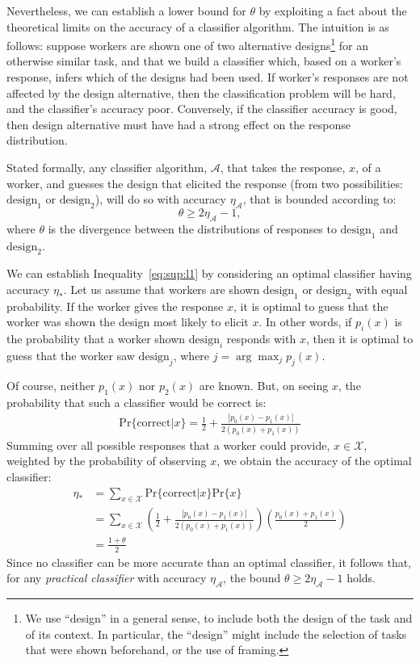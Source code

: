 \documentclass{sigchi}
\begin{document}
Nevertheless, we can establish a lower bound for $\theta$ by 
exploiting a fact about the theoretical limits on the accuracy of a 
classifier algorithm.  The intuition is as follows: 
suppose workers are shown one of two alternative designs\footnote{We
use ``design'' in a general sense, to include both the design of the task
and of its context.  In particular, the ``design'' might include the
selection of tasks that were shown beforehand, or the use of framing.}
for an otherwise
similar task, and that we build a classifier which, 
based on a worker's response, infers which of the designs had been 
used.
If worker's responses are not affected by the design alternative,
then the classification problem will be hard, and the classifier's 
accuracy poor.
Conversely, if the classifier accuracy is good, then design alternative 
must have had a strong effect on the response distribution.

Stated formally, any classifier algorithm, $\mathcal{A}$, that
takes the response, $x$, of a worker, and guesses the 
design that elicited the response (from two possibilities:
$\mathrm{design}_1$ or $\mathrm{design}_2$), will do so with accuracy 
$\eta_\mathcal{A}$, that is bounded according to:
\begin{equation}
	\theta \geq 2\eta_\mathcal{A} - 1,
	\label{eq:sup:l1}
\end{equation}
where $\theta$ is the divergence between the distributions of responses
to $\mathrm{design}_1$ and $\mathrm{design}_2$.

We can establish Inequality~\ref{eq:sup:l1} by considering an
optimal classifier having accuracy $\eta_*$.  
Let us assume that workers are shown 
$\mathrm{design}_1$ or $\mathrm{design}_2$ with equal probability.
If the worker gives the response $x$, it is optimal to guess
that the worker was shown the design most likely to elicit $x$.
In other words, if $p_i(x)$ is the probability that a worker shown 
$\mathrm{design}_i$ responds with $x$, then it is optimal to 
guess that the worker saw $\mathrm{design}_j$, where 
$j = \arg\max_j{p_j(x)}$.

Of course, neither $p_1(x)$ nor $p_2(x)$ are known.  But, on seeing $x$,
the probability that such a classifier would be correct is:
\begin{align}
  \mathrm{Pr}\{\mathrm{correct}|x\} = \frac{1}{2} 
	+ \frac{|p_0(x) - p_1(x)|}{2(p_0(x) + p_1(x))}
\end{align}
Summing over all possible responses that a worker could provide, 
$x \in \mathcal{X}$, weighted by the probability of observing $x$, 
we obtain the accuracy of the optimal classifier:
\begin{align}
\eta_* 
  &= \sum_{x\in\mathcal{X}} 
	\mathrm{Pr}\{\mathrm{correct}|x\}\mathrm{Pr}\{x\} \\
  &= \sum_{x\in\mathcal{X}} 
	\left(
	\frac{1}{2} + \frac{|p_0(x) - p_1(x)|}{2(p_0(x) + p_1(x))}
  \right) \left( 
	\frac{p_0(x) + p_1(x)}{2} 
  \right) \\
  &= \frac{1 + \theta}{2}
\end{align}
Since no classifier can be more accurate than an optimal classifier,
it follows that, for any \textit{practical classifier} 
with accuracy $\eta_\mathcal{A}$, the bound 
$\theta \geq 2\eta_\mathcal{A} -1$ holds.
\end{document}
